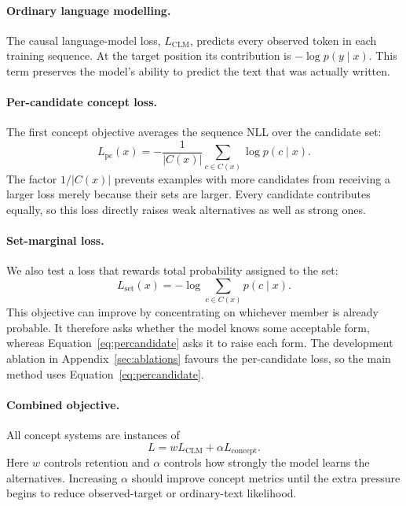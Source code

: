 \documentclass[11pt]{article}
\begin{document}
\paragraph{Ordinary language modelling.}
The causal language-model loss, $L_{\mathrm{CLM}}$, predicts every observed token
in each training sequence. At the target position its contribution is
$-\log p(y\mid x)$. This term preserves the model's ability to predict the text
that was actually written.

\paragraph{Per-candidate concept loss.}
The first concept objective averages the sequence NLL over the candidate set:
\begin{equation}
L_{\mathrm{pc}}(x)=-\frac{1}{|C(x)|}\sum_{c\in C(x)}\log p(c\mid x).
\label{eq:percandidate}
\end{equation}
The factor $1/|C(x)|$ prevents examples with more candidates from receiving a
larger loss merely because their sets are larger. Every candidate contributes
equally, so this loss directly raises weak alternatives as well as strong ones.

\paragraph{Set-marginal loss.}
We also test a loss that rewards total probability assigned to the set:
\begin{equation}
L_{\mathrm{set}}(x)=-\log\sum_{c\in C(x)}p(c\mid x).
\label{eq:set}
\end{equation}
This objective can improve by concentrating on whichever member is already
probable. It therefore asks whether the model knows some acceptable form,
whereas Equation~\ref{eq:percandidate} asks it to raise each form. The
development ablation in Appendix~\ref{sec:ablations} favours the per-candidate
loss, so the main method uses Equation~\ref{eq:percandidate}.

\paragraph{Combined objective.}
All concept systems are instances of
\begin{equation}
L=wL_{\mathrm{CLM}}+\alpha L_{\mathrm{concept}}.
\label{eq:combined}
\end{equation}
Here $w$ controls retention and $\alpha$ controls how strongly the model learns
the alternatives. Increasing $\alpha$ should improve concept metrics until the
extra pressure begins to reduce observed-target or ordinary-text likelihood.
\end{document}
